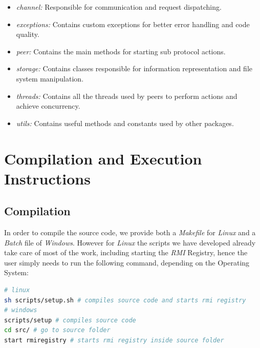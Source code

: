 \documentclass[a4paper]{article}
\begin{document}
    \begin{itemize}
        \item \textit{channel:} Responsible for communication and request dispatching.
        
        \item \textit{exceptions:} Contains custom exceptions for better error handling and code quality.
        
        \item \textit{peer:} Contains the main methods for starting sub protocol actions.
        
        \item \textit{storage:} Contains classes responsible for information representation and file system manipulation.
        
        \item \textit{threads:} Contains all the threads used by peers to perform actions and achieve concurrency.
        
        \item \textit{utils:} Contains useful methods and constants used by other packages.
    \end{itemize}

\section{Compilation and Execution Instructions}

    \subsection{Compilation}

        In order to compile the source code, we provide both a \textit{Makefile} for \textit{Linux} and a \textit{Batch} file of \textit{Windows}. However for \textit{Linux} the scripts we have developed already take care of most of the work, including starting the \textit{RMI} Registry, hence the user simply needs to run the following command, depending on the Operating System:

\begin{lstlisting}[language=Bash, caption=Executing Compilation Scripts]
# linux
sh scripts/setup.sh # compiles source code and starts rmi registry
# windows
scripts/setup # compiles source code
cd src/ # go to source folder
start rmiregistry # starts rmi registry inside source folder
\end{lstlisting}
\end{document}

